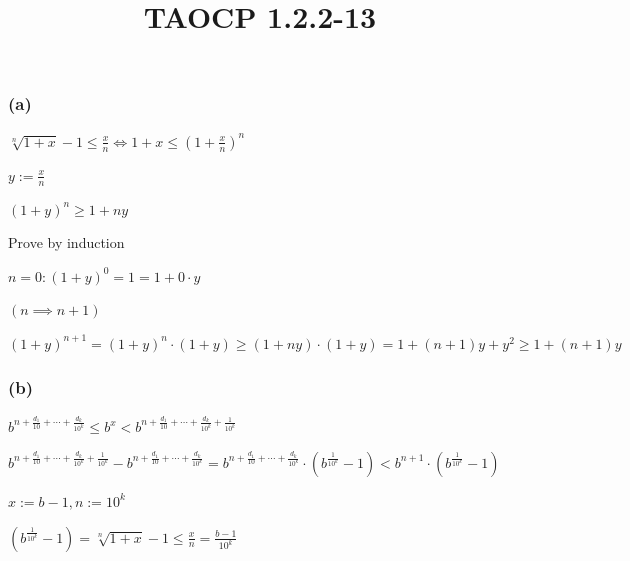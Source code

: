 \documentclass{article}
\title{TAOCP 1.2.2\mbox{-}13}
\begin{document}
\maketitle

\subsubsection*{(a)}

\( \sqrt[n]{1+x} - 1 \leq \frac{x}{n} \iff 1+x \leq {(1+\frac{x}{n})}^{n} \)

\( y := \frac{x}{n} \)

\( {(1+y)}^{n} \geq 1 + ny \)

Prove by induction

\( n = 0: {(1+y)}^{0}=1=1+0\cdot y \)

\( (n \implies n + 1) \)

\( {(1+y)}^{n+1} = {(1+y)}^{n} \cdot (1+y) \geq (1+ny)\cdot(1+y)=1+(n+1)y+y^{2} \geq 1+(n+1)y \)

\subsubsection*{(b)}

\( b^{n+\frac{d_{1}}{10}+\cdots+\frac{d_{k}}{10^{k}}} \leq b^{x} < b^{n+\frac{d_{1}}{10}+\cdots+\frac{d_{k}}{10^{k}} + \frac{1}{10^{k}}} \)

\( b^{n+\frac{d_{1}}{10}+\cdots+\frac{d_{k}}{10^{k}} + \frac{1}{10^{k}}} - b^{n+\frac{d_{1}}{10}+\cdots+\frac{d_{k}}{10^{k}}} = b^{n+\frac{d_{1}}{10}+\cdots+\frac{d_{k}}{10^{k}}} \cdot (b^{\frac{1}{10^{k}}} - 1) < b^{n+1} \cdot (b^{\frac{1}{10^{k}}} - 1) \)

\( x := b - 1, n := 10^{k} \)

\( (b^{\frac{1}{10^{k}}} - 1) = \sqrt[n]{1+x} - 1 \leq \frac{x}{n} = \frac{b-1}{10^{k}} \)
\end{document}
